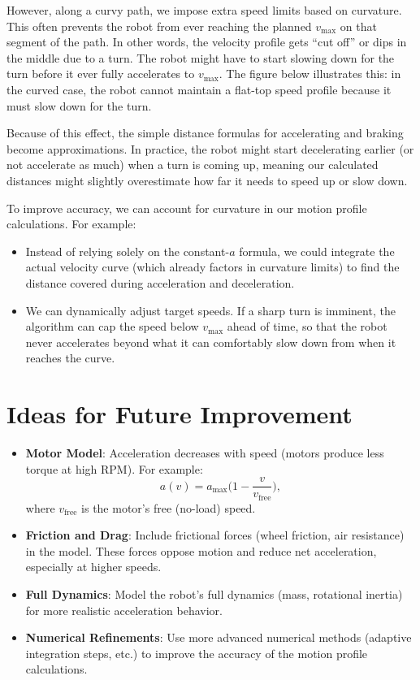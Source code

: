 \documentclass[11pt]{article}
\begin{document}
However, along a curvy path, we impose extra speed limits based on curvature. This often prevents the robot from ever reaching the planned $v_{\max}$ on that segment of the path. In other words, the velocity profile gets “cut off” or dips in the middle due to a turn. The robot might have to start slowing down for the turn before it ever fully accelerates to $v_{\max}$. The figure below illustrates this: in the curved case, the robot cannot maintain a flat-top speed profile because it must slow down for the turn.


Because of this effect, the simple distance formulas for accelerating and braking become approximations. In practice, the robot might start decelerating earlier (or not accelerate as much) when a turn is coming up, meaning our calculated distances might slightly overestimate how far it needs to speed up or slow down.

To improve accuracy, we can account for curvature in our motion profile calculations. For example:
\begin{itemize}
  \item Instead of relying solely on the constant-$a$ formula, we could integrate the actual velocity curve (which already factors in curvature limits) to find the distance covered during acceleration and deceleration.
  \item We can dynamically adjust target speeds. If a sharp turn is imminent, the algorithm can cap the speed below $v_{\max}$ ahead of time, so that the robot never accelerates beyond what it can comfortably slow down from when it reaches the curve.
\end{itemize}

\section{Ideas for Future Improvement}

\begin{itemize}
  \item \textbf{Motor Model}: Acceleration decreases with speed (motors produce less torque at high RPM). For example:
  \[
    a(v) = a_{\text{max}}\Big(1 - \frac{v}{v_{\text{free}}}\Big),
  \]
  where $v_{\text{free}}$ is the motor’s free (no-load) speed.
  \item \textbf{Friction and Drag}: Include frictional forces (wheel friction, air resistance) in the model. These forces oppose motion and reduce net acceleration, especially at higher speeds.
  \item \textbf{Full Dynamics}: Model the robot’s full dynamics (mass, rotational inertia) for more realistic acceleration behavior.
  \item \textbf{Numerical Refinements}: Use more advanced numerical methods (adaptive integration steps, etc.) to improve the accuracy of the motion profile calculations.
\end{itemize}
\end{document}
